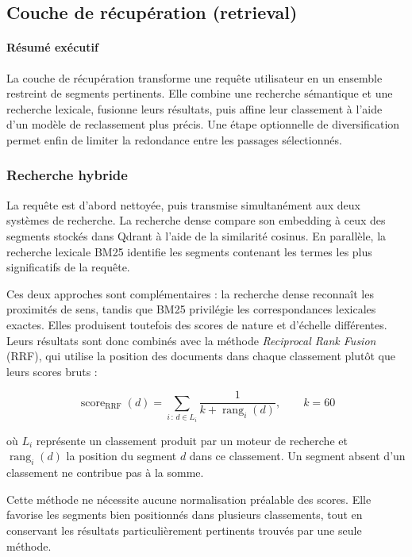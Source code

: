 \subsection{Couche de récupération (retrieval)}

\paragraph{Résumé exécutif}

La couche de récupération transforme une requête utilisateur en un ensemble restreint
de segments pertinents. Elle combine une recherche sémantique et une recherche
lexicale, fusionne leurs résultats, puis affine leur classement à l'aide d'un modèle
de reclassement plus précis. Une étape optionnelle de diversification permet enfin de
limiter la redondance entre les passages sélectionnés.

\subsubsection{Recherche hybride}

La requête est d'abord nettoyée, puis transmise simultanément aux deux systèmes de
recherche. La recherche dense compare son embedding à ceux des segments stockés dans
Qdrant à l'aide de la similarité cosinus. En parallèle, la recherche lexicale BM25
identifie les segments contenant les termes les plus significatifs de la requête.

Ces deux approches sont complémentaires : la recherche dense reconnaît les proximités
de sens, tandis que BM25 privilégie les correspondances lexicales exactes. Elles
produisent toutefois des scores de nature et d'échelle différentes. Leurs résultats
sont donc combinés avec la méthode \emph{Reciprocal Rank Fusion} (RRF), qui utilise la
position des documents dans chaque classement plutôt que leurs scores bruts :

\[
  \operatorname{score}_{\mathrm{RRF}}(d)
  =
  \sum_{i\,:\,d \in L_i}
  \frac{1}{k + \operatorname{rang}_{i}(d)},
  \qquad k = 60
\]

où \(L_i\) représente un classement produit par un moteur de recherche et
\(\operatorname{rang}_{i}(d)\) la position du segment \(d\) dans ce classement. Un
segment absent d'un classement ne contribue pas à la somme.

Cette méthode ne nécessite aucune normalisation préalable des scores. Elle favorise
les segments bien positionnés dans plusieurs classements, tout en conservant les
résultats particulièrement pertinents trouvés par une seule méthode.

